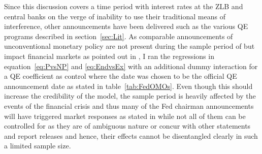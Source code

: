 Since this discussion covers a time period with interest rates at the ZLB and central banks on the verge of inability to use their traditional means of interference, other announcements have been delivered such as the various QE programs described in section~\ref{sec:Lit}. As comparable announcements of unconventional monetary policy are not present during the sample period of \textcite{Ellingsen.2003} but impact financial markets as pointed out in \textcite{Hattori.2016}, I ran the regressions in equation~\ref{eq:PvsNP} and \ref{eq:EndvsEx} with an additional dummy interaction for a QE coefficient as control where the date was chosen to be the official QE announcement date as stated in table~\vref{tab:FedOMOs}. 
Even though this should increase the credibility of the model, the sample period is heavily affected by the events of the financial crisis and thus many of the Fed chairman announcements will have triggered market responses as stated in \textcite{Blinder.2010} while not all of them can be controlled for as they are of ambiguous nature or concur with other statements and report releases and hence, their effects cannot be disentangled clearly in such a limited sample size.
%
